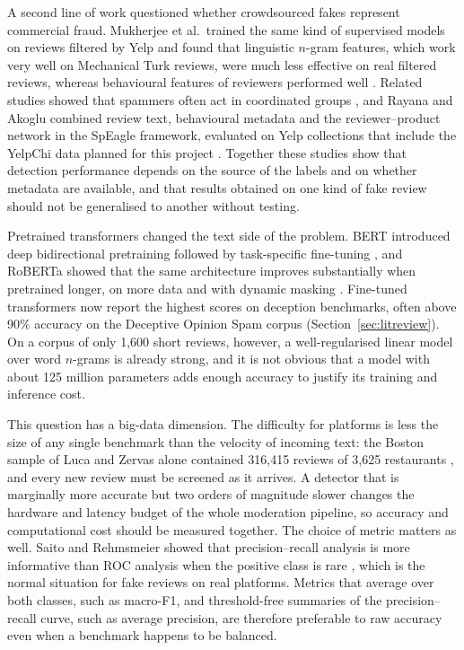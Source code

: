 A second line of work questioned whether crowdsourced fakes represent commercial fraud. Mukherjee et al.\ trained the same kind of supervised models on reviews filtered by Yelp and found that linguistic $n$-gram features, which work very well on Mechanical Turk reviews, were much less effective on real filtered reviews, whereas behavioural features of reviewers performed well \cite{mukherjee2013}. Related studies showed that spammers often act in coordinated groups \cite{mukherjee2012}, and Rayana and Akoglu combined review text, behavioural metadata and the reviewer--product network in the SpEagle framework, evaluated on Yelp collections that include the YelpChi data planned for this project \cite{rayana2015}. Together these studies show that detection performance depends on the source of the labels and on whether metadata are available, and that results obtained on one kind of fake review should not be generalised to another without testing.

Pretrained transformers changed the text side of the problem. BERT introduced deep bidirectional pretraining followed by task-specific fine-tuning \cite{devlin2019}, and RoBERTa showed that the same architecture improves substantially when pretrained longer, on more data and with dynamic masking \cite{liu2019roberta}. Fine-tuned transformers now report the highest scores on deception benchmarks, often above 90\% accuracy on the Deceptive Opinion Spam corpus (Section~\ref{sec:litreview}). On a corpus of only 1,600 short reviews, however, a well-regularised linear model over word $n$-grams is already strong, and it is not obvious that a model with about 125 million parameters adds enough accuracy to justify its training and inference cost.

This question has a big-data dimension. The difficulty for platforms is less the size of any single benchmark than the velocity of incoming text: the Boston sample of Luca and Zervas alone contained 316,415 reviews of 3,625 restaurants \cite{luca2016}, and every new review must be screened as it arrives. A detector that is marginally more accurate but two orders of magnitude slower changes the hardware and latency budget of the whole moderation pipeline, so accuracy and computational cost should be measured together. The choice of metric matters as well. Saito and Rehmsmeier showed that precision--recall analysis is more informative than ROC analysis when the positive class is rare \cite{saito2015}, which is the normal situation for fake reviews on real platforms. Metrics that average over both classes, such as macro-F1, and threshold-free summaries of the precision--recall curve, such as average precision, are therefore preferable to raw accuracy even when a benchmark happens to be balanced.

